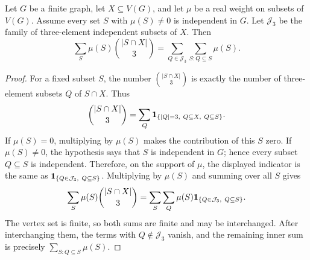 \begin{helper}
Let $G$ be a finite graph, let $X\subseteq V(G)$, and let $\mu$ be a real
weight on subsets of $V(G)$.  Assume every set $S$ with $\mu(S)\ne0$ is
independent in $G$.  Let $\mathcal J_3$ be the family of three-element
independent subsets of $X$.  Then
\[
\sum_S \mu(S)\binom{|S\cap X|}{3}
=\sum_{Q\in\mathcal J_3}\sum_{S:Q\subseteq S}\mu(S).
\]
\end{helper}
\begin{proof}
For a fixed subset $S$, the number $\binom{|S\cap X|}{3}$ is exactly the
number of three-element subsets $Q$ of $S\cap X$.  Thus
\[
\binom{|S\cap X|}{3}
=\sum_Q {\bf 1}_{\{|Q|=3,\ Q\subseteq X,\ Q\subseteq S\}}.
\]
If $\mu(S)=0$, multiplying by $\mu(S)$ makes the contribution of this $S$
zero.  If $\mu(S)\ne0$, the hypothesis says that $S$ is independent in $G$;
hence every subset $Q\subseteq S$ is independent.  Therefore, on the support
of $\mu$, the displayed indicator is the same as
${\bf 1}_{\{Q\in\mathcal J_3,\ Q\subseteq S\}}$.  Multiplying by $\mu(S)$ and
summing over all $S$ gives
\[
\sum_S\mu(S)\binom{|S\cap X|}{3}
=\sum_S\sum_Q \mu(S){\bf 1}_{\{Q\in\mathcal J_3,\ Q\subseteq S\}}.
\]
The vertex set is finite, so both sums are finite and may be interchanged.
After interchanging them, the terms with $Q\notin\mathcal J_3$ vanish, and
the remaining inner sum is precisely $\sum_{S:Q\subseteq S}\mu(S)$.

\end{proof}
